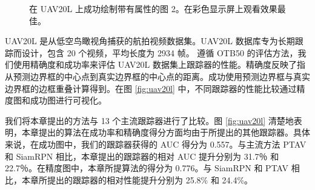 \begin{figure}[t]
\begin{center}
\end{center}
   \caption{在 UAV20L 上成功绘制带有属性的图 2。在彩色显示屏上观看效果最佳。}
\label{fig:uav20l_attr}
\end{figure}
\fi

UAV20L \cite{mueller2016benchmark} 是从低空鸟瞰视角捕获的航拍视频数据集。UAV20L 数据库专为长期跟踪而设计，包含 20 个视频，平均长度为 2934 帧。
遵循 OTB50 \cite{OTB} 的评估方法，我们使用精确度和成功率来评估 UAV20L 数据集上跟踪器的性能。精确度反映了指从预测边界框的中心点到真实边界框的中心点的距离。成功使用预测边界框与真实边界框的边框重叠计算得到。在图 \ref{fig:uav20l} 中，不同跟踪器的性能比较通过精度图和成功图进行可视化。

我们将本章提出的方法与 13 个主流跟踪器进行了比较。图 \ref{fig:uav20l} 清楚地表明，本章提出的算法在成功率和精确度得分方面均由于所提出的其他跟踪器。具体来说，在成功图中，我们的跟踪器获得的 AUC 得分为 0.557。与主流方法 PTAV \cite{fan2018parallel} 和 SiamRPN \cite{SiamRPN} 相比，本章提出的跟踪器的相对 AUC 提升分别为 31.7％ 和 22.7％。在精度图中，本章所提算法的得分为 0.776。与 SiamRPN \cite{SiamRPN} 和 PTAV \cite{fan2018parallel} 相比，本章所提出的跟踪器的相对性能提升分别为 25.8\% 和 24.4\%。

